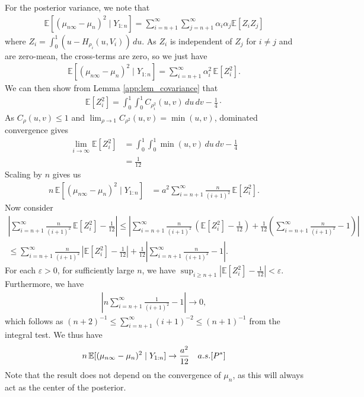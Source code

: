 \documentclass[11pt,a4paper]{article}
\newcommand{\E}{\mathbb{E}}
\begin{document}
\begin{appendices}
For the posterior variance, we note that
\begin{align*}
  \E[(\mu_{n\infty} - \mu_{n})^2\mid Y_{1:n}]=\sum_{i =n+1}^\infty  \sum_{j =n+1}^\infty \alpha_i \alpha_j \E[Z_i Z_j]
\end{align*}
where $Z_i = \int_0^1 (u- H_{\rho_i}(u,V_i))\, du$. 
As $Z_i$ is independent of $Z_j$ for $i \neq j$ and are zero-mean, the cross-terms are zero, so we just have
\begin{align*}
     \E[(\mu_{n\infty} - \mu_{n})^2\mid Y_{1:n}]=\sum_{i =n+1}^\infty \alpha_i^2 \, \E[Z_i^2].
\end{align*}
We can then show from {Lemma \ref{app:lem_covariance}} that
\begin{align*}
    \E[Z_i^2] = \int_0^1\int_0^1 C_{\rho_i^2}(u,v)\,du\, dv - \frac{1}{4}\cdot
\end{align*}
As $C_\rho(u,v) \leq 1$ and $\lim_{\rho \to 1} C_{\rho^2}(u,v) = \min(u,v)$, dominated convergence gives 
\begin{align*}
    \lim_{i \to \infty}\E[Z_i^2] &= \int_0^1 \int_0^1 \min(u,v)\,du \, dv - \frac{1}{4}\\
    &= \frac{1}{12}
\end{align*}
Scaling by ${n}$ gives us
\begin{align*}
  {n}\, \E[(\mu_{n\infty} - \mu_{n})^2\mid Y_{1:n}]&=a^2 \sum_{i = n+1}^\infty\frac{{n}}{(i+1)^2}\,  \E[Z_i^2].
\end{align*}
Now consider
\begin{align*}
   \left|  \sum_{i = n+1}^\infty\frac{{n}}{(i+1)^2}\,  \E[Z_i^2]  - \frac{1}{12}\right| \leq    \left|  \sum_{i = n+1}^\infty\frac{{n}}{(i+1)^2}\,  \left(\E[Z_i^2]  - \frac{1}{12}\right) + \frac{1}{12}\left(\sum_{i = n+1}^\infty \frac{{n}}{(i+1)^2} - 1\right)\right|\\
   \leq \sum_{i = n+1}^\infty\frac{{n}}{(i+1)^2}\,  \left|\E[Z_i^2]  - \frac{1}{12}\right| + \frac{1}{12}\left|\sum_{i = n+1}^\infty \frac{{n}}{(i+1)^2} - 1 \right|. 
\end{align*}
For each $\varepsilon > 0$, for sufficiently large $n$, we have $\sup_{i \geq n+1}\left|\E[Z_i^2]- \frac{1}{12} \right|< \varepsilon$. Furthermore, we have
\begin{align*}
    \left|n\sum_{i = n+1}^\infty \frac{1}{(i+1)^2} - 1 \right| \to 0,
\end{align*}
which follows as $(n+2)^{-1} \leq\sum_{i = n+1}^\infty (i+1)^{-2} \leq (n+1)^{-1}$ from the integral test.
We thus have
\begin{align*}
     {n}\, \E[(\mu_{n\infty} - \mu_{n})^2\mid Y_{1:n}] \to \frac{a^2}{12} \quad \textnormal{a.s.}[P^*]
\end{align*}
Note that the result does not depend on the convergence of $\mu_n$, as this will always act as the center of the posterior.


\end{appendices}
\end{document}
